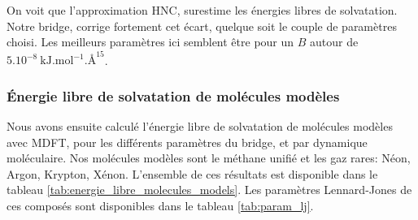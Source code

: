 On voit que l'approximation HNC, surestime les énergies libres de solvatation. Notre bridge, corrige fortement cet écart, quelque soit le couple de paramètres choisi. Les meilleurs paramètres ici semblent être pour un $B$ autour de $5.10^{-8}\  \mathrm{kJ.mol}^{-1}.\text{\AA}^{15}$. 

 



\subsubsection{\'Energie libre de solvatation de molécules modèles}
Nous avons ensuite calculé l'énergie libre de solvatation de molécules modèles avec MDFT, pour les différents paramètres du bridge, et par dynamique moléculaire. Nos molécules modèles sont le méthane unifié et les gaz rares: Néon, Argon, Krypton, Xénon. L'ensemble de ces résultats est disponible dans le tableau \ref{tab:energie_libre_molecules_models}. Les paramètres Lennard-Jones de ces composés sont disponibles dans le tableau \ref{tab:param_lj}.


